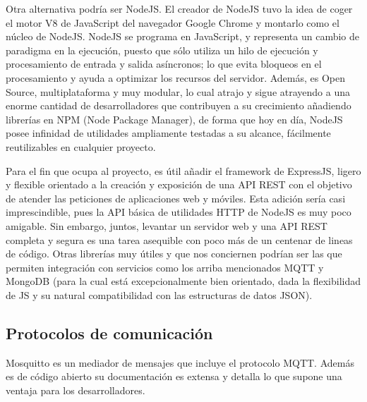 \vspace{1cm}

Otra alternativa podría ser NodeJS. El creador de NodeJS tuvo la idea de coger el motor V8 de JavaScript del navegador Google Chrome y montarlo como el núcleo de NodeJS. NodeJS se programa en JavaScript, y representa un cambio de paradigma en la ejecución, puesto que sólo utiliza un hilo de ejecución y procesamiento de entrada y salida asíncronos; lo que evita bloqueos en el procesamiento y ayuda a optimizar los recursos del servidor.  Además, es Open Source, multiplataforma y muy modular, lo cual atrajo y sigue atrayendo a una enorme cantidad de desarrolladores que contribuyen a su crecimiento añadiendo librerías en NPM (Node Package Manager), de forma que hoy en día, NodeJS posee infinidad de utilidades ampliamente testadas a su alcance, fácilmente reutilizables en cualquier proyecto.

\vspace{1cm}

Para el fin que ocupa al proyecto, es útil añadir el \gls{framework} de ExpressJS, ligero y flexible orientado a la creación y exposición de una API REST con el objetivo de atender las peticiones de aplicaciones web y móviles. Esta adición sería casi imprescindible, pues la API básica de utilidades HTTP de NodeJS es muy poco amigable. Sin embargo, juntos, levantar un servidor web y una API REST completa y segura es una tarea asequible con poco más de un centenar de lineas de código. Otras librerías muy útiles y que nos conciernen podrían ser las que permiten integración con servicios como los arriba mencionados MQTT y MongoDB (para la cual está excepcionalmente bien orientado, dada la flexibilidad de JS y su natural compatibilidad con las estructuras de datos JSON).

\vspace{1cm}

\subsection{Protocolos de comunicación}
\label{ch:Capitulo2.3.2}


Mosquitto es un mediador de mensajes que incluye el protocolo MQTT. Además es de código abierto su documentación es extensa y detalla lo que supone una ventaja para los desarrolladores.

\vspace{1cm}

